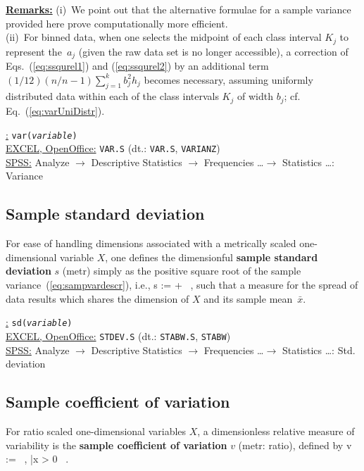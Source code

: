 %
\underline{\textbf{Remarks:}} (i)~We point out that the alternative 
formulae for a sample variance provided here prove computationally 
more efficient.\\
(ii)~For binned data, when one selects the midpoint of each class 
interval $K_{j}$ to represent the~$a_{j}$ (given the raw data set 
is no longer accessible), a correction of Eqs.~(\ref{eq:ssqurel1}) 
and (\ref{eq:ssqurel2}) by an additional term 
$(1/12)(n/n-1)\sum_{j=1}^{k}b_{j}^{2}h_{j}$ becomes necessary,
assuming uniformly distributed data within each of the class
intervals $K_{j}$ of width $b_{j}$; cf. Eq.~(\ref{eq:varUniDistr}).

\medskip
\noindent
\underline{\R:} \texttt{var(\textit{variable})} \\
\underline{EXCEL, OpenOffice:} \texttt{VAR.S} (dt.: \texttt{VAR.S},
\texttt{VARIANZ}) \\
\underline{SPSS:} Analyze $\rightarrow$ Descriptive Statistics
$\rightarrow$ Frequencies \ldots $\rightarrow$ Statistics
\ldots: Variance

\subsection[Sample standard deviation]{Sample standard deviation}
For ease of handling dimensions associated with a metrically 
scaled one-dimensional variable $X$, one defines the dimensionful 
\textbf{sample standard deviation} $s$ (metr) simply as the positive 
square root of the sample variance~(\ref{eq:sampvardescr}), i.e.,
%
\be
s := + \ ,
\ee
%
such that a measure for the spread of data results which shares 
the dimension of $X$ and its sample mean~$\bar{x}$.

\medskip
\noindent
\underline{\R:} \texttt{sd(\textit{variable})} \\
\underline{EXCEL, OpenOffice:} \texttt{STDEV.S} (dt.:
\texttt{STABW.S}, \texttt{STABW}) \\
\underline{SPSS:} Analyze $\rightarrow$ Descriptive Statistics
$\rightarrow$ Frequencies \ldots $\rightarrow$ Statistics
\ldots: Std. deviation

\subsection[Sample coefficient of variation]{Sample coefficient of
variation}
For ratio scaled one-dimensional variables $X$, a dimensionless 
relative measure of variability is the \textbf{sample coefficient of 
variation} $v$ (metr: ratio), defined by
%
\be
v :=  \ ,
\quad{}\quad
\bar{x} > 0 \ .
\ee
%

